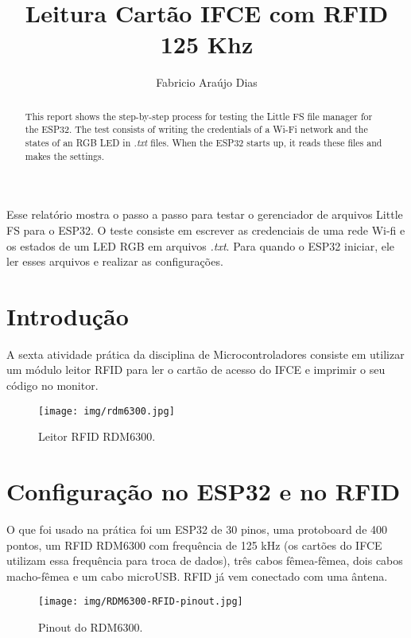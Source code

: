 \documentclass[12pt]{article}
\title{Leitura Cartão IFCE com RFID 125 Khz}
\author{Fabricio Araújo Dias}
\begin{document}
 

\maketitle

\begin{abstract}
  This report shows the step-by-step process for testing the Little FS file manager for the ESP32. The test consists of writing the credentials of a Wi-Fi network and the states of an RGB LED in \textit{.txt} files. When the ESP32 starts up, it reads these files and makes the settings.
\end{abstract}
     
\begin{resumo} 
  Esse relatório mostra o passo a passo para testar o gerenciador de arquivos Little FS para o ESP32. O teste consiste em escrever as credenciais de uma rede Wi-fi e os estados de um LED RGB em arquivos \textit{.txt}. Para quando o ESP32 iniciar, ele ler esses arquivos e realizar as configurações.
\end{resumo}


\section{Introdução}

A sexta atividade prática da disciplina de Microcontroladores consiste em utilizar um módulo leitor RFID para ler o cartão de acesso do IFCE e imprimir o seu código no monitor.

\begin{figure}[H]
    \centering
    \texttt{[image: img/rdm6300.jpg]}
    \caption{Leitor RFID RDM6300.}
    \label{fig:RDM6300}
\end{figure}

\section{Configuração no ESP32 e no RFID}

O que foi usado na prática foi um ESP32 de 30 pinos, uma protoboard de 400 pontos, um RFID RDM6300 com frequência de 125 kHz (os cartões do IFCE utilizam essa frequência para troca de dados), três cabos fêmea-fêmea, dois cabos macho-fêmea e um cabo microUSB. RFID já vem conectado com uma ântena.

\begin{figure}[H]
    \centering
    \texttt{[image: img/RDM6300-RFID-pinout.jpg]}
    \caption{Pinout do RDM6300.}
    \label{fig:RDM6300-pinout}
\end{figure}
\end{document}
